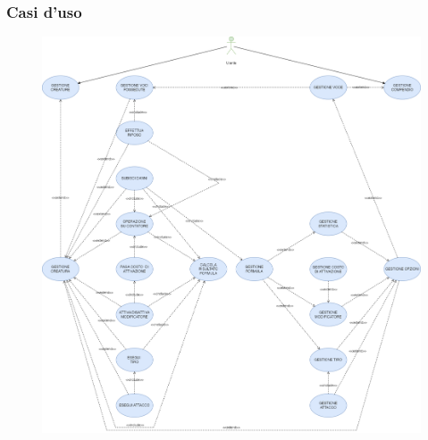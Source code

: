 \documentclass[a4paper, 11pt]{article}
\begin{document}
\subsubsection{Casi d'uso}
\begin{figure}[h!]
    \centering
    \includegraphics[width=1\textwidth,keepaspectratio]{Diagramma CU}
    \label{fig:useCase}
\end{figure}



\newpage
\end{document}
